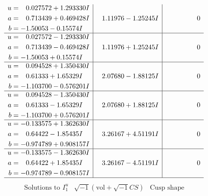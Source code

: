 \documentclass[1p]{elsarticle_modified}
\theoremstyle{definition}
\newcommand{\I}{\sqrt{-1}}
\begin{document}
$$\begin{array}{c|c|c}
\begin{aligned}
u &= \phantom{-}0.027572 + 1.293330 I \\
a &= \phantom{-}0.713439 + 0.469428 I \\
b &= -1.50053 - 0.15574 I\end{aligned}
 & \phantom{-}1.11976 - 1.25245 I & \phantom{-0.000000 } 0 \\ \hline\begin{aligned}
u &= \phantom{-}0.027572 - 1.293330 I \\
a &= \phantom{-}0.713439 - 0.469428 I \\
b &= -1.50053 + 0.15574 I\end{aligned}
 & \phantom{-}1.11976 + 1.25245 I & \phantom{-0.000000 } 0 \\ \hline\begin{aligned}
u &= \phantom{-}0.094528 + 1.350430 I \\
a &= \phantom{-}0.61333 + 1.65329 I \\
b &= -1.103700 - 0.576201 I\end{aligned}
 & \phantom{-}2.07680 - 1.88125 I & \phantom{-0.000000 } 0 \\ \hline\begin{aligned}
u &= \phantom{-}0.094528 - 1.350430 I \\
a &= \phantom{-}0.61333 - 1.65329 I \\
b &= -1.103700 + 0.576201 I\end{aligned}
 & \phantom{-}2.07680 + 1.88125 I & \phantom{-0.000000 } 0 \\ \hline\begin{aligned}
u &= -0.133575 + 1.362630 I \\
a &= \phantom{-}0.64422 - 1.85435 I \\
b &= -0.974789 + 0.908157 I\end{aligned}
 & \phantom{-}3.26167 + 4.51191 I & \phantom{-0.000000 } 0 \\ \hline\begin{aligned}
u &= -0.133575 - 1.362630 I \\
a &= \phantom{-}0.64422 + 1.85435 I \\
b &= -0.974789 - 0.908157 I\end{aligned}
 & \phantom{-}3.26167 - 4.51191 I & \phantom{-0.000000 } 0\\
 \hline 
 \end{array}$$\newpage$$\begin{array}{c|c|c}  
\text{Solutions to }I^u_{1}& \I (\text{vol} + \sqrt{-1}CS) & \text{Cusp shape}\\

\end{array}$$
\end{document}
